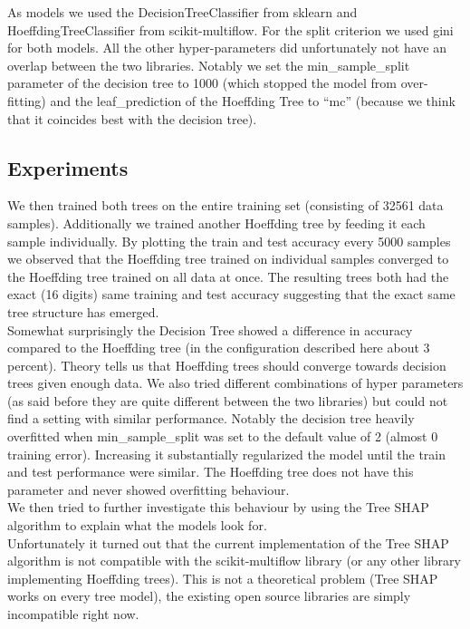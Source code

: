 \documentclass[conference]{IEEEtran}
\begin{document}
As models we used the DecisionTreeClassifier from sklearn and HoeffdingTreeClassifier from scikit-multiflow.
For the split criterion we used gini for both models. 
All the other hyper-parameters did unfortunately not have an overlap between the two libraries. 
Notably we set the min\_sample\_split parameter of the decision tree to 1000 (which stopped the model from over-fitting) and the leaf\_prediction of the Hoeffding Tree to ``mc'' (because we think that it coincides best with the decision tree).\\

\subsection{Experiments}

We then trained both trees on the entire training set (consisting of 32561 data samples).
Additionally we trained another Hoeffding tree by feeding it each sample individually.
By plotting the train and test accuracy every 5000 samples we observed that the Hoeffding tree trained on individual samples converged to the Hoeffding tree trained on all data at once. 
The resulting trees both had the exact (16 digits) same training and test accuracy suggesting that the exact same tree structure has emerged.\\
Somewhat surprisingly the Decision Tree showed a difference in accuracy compared to the Hoeffding tree (in the configuration described here about 3 percent). 
Theory tells us that Hoeffding trees should converge towards decision trees given enough data.
We also tried different combinations of hyper parameters (as said before they are quite different between the two libraries) but could not find a setting with similar performance.
Notably the decision tree heavily overfitted when min\_sample\_split was set to the default value of 2 (almost 0 training error). Increasing it substantially regularized the model until the train and test performance were similar. 
The Hoeffding tree does not have this parameter and never showed overfitting behaviour.\\
We then tried to further investigate this behaviour by using the Tree SHAP algorithm to explain what the models look for.\\
Unfortunately it turned out that the current implementation of the Tree SHAP algorithm \cite{b16} is not compatible with the scikit-multiflow library (or any other library implementing Hoeffding trees).
This is not a theoretical problem (Tree SHAP works on every tree model), the existing open source libraries are simply incompatible right now.\\
\end{document}
